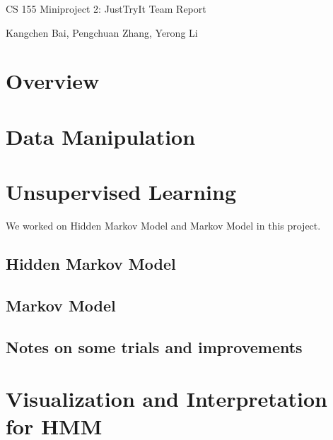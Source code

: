 





\pagestyle{fancy}

\LARGE
\begin{center}
CS 155 Miniproject 2: JustTryIt Team Report

\large
Kangchen Bai, Pengchuan Zhang, Yerong Li
\end{center}

\normalsize
\medskip

\section{Overview}



\section{Data Manipulation}


\section{Unsupervised Learning}
We worked on Hidden Markov Model and Markov Model in this project.

\subsection{Hidden Markov Model}

\subsection{Markov Model}

\subsection{Notes on some trials and improvements}


\section{Visualization and Interpretation for HMM}


